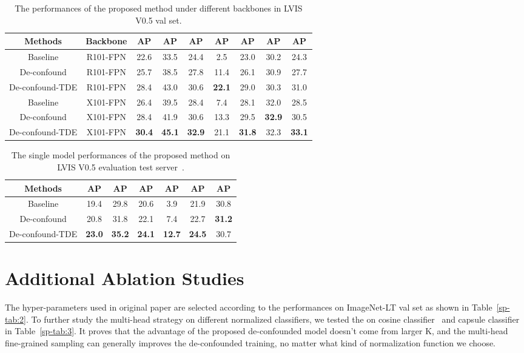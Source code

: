 \documentclass{article}
\begin{document}
\begin{table}
\centering
{
\begin{tabular}{c| c | c  c  c | c  c  c | c}
\hline
\hline
Methods & Backbone & AP & AP & AP & AP & AP & AP & AP \\
\hline
Baseline & R101-FPN & 22.6 & 33.5 & 24.4 & 2.5 & 23.0 & 30.2 & 24.3     \\
De-confound & R101-FPN & 25.7 & 38.5 & 27.8 & 11.4 & 26.1 & 30.9 & 27.7    \\
De-confound-TDE & R101-FPN & 28.4 & 43.0 & 30.6 & \textbf{22.1} & 29.0 & 30.3 & 31.0    \\
\hline
Baseline & X101-FPN & 26.4 & 39.5 & 28.4 & 7.4 & 28.1 & 32.0 & 28.5    \\
De-confound & X101-FPN & 28.4 & 41.9 & 30.6 & 13.3 & 29.5 & \textbf{32.9} & 30.5    \\
De-confound-TDE & X101-FPN & \textbf{30.4} & \textbf{45.1} & \textbf{32.9} & 21.1 & \textbf{31.8} & 32.3 & \textbf{33.1}    \\
\hline
\hline
\end{tabular}
}
\caption{The performances of the proposed method under different backbones in LVIS V0.5 val set.}
\label{sp-tab:5}
\end{table}


\begin{table}[ht!]
\centering
{
\begin{tabular}{c| c  c  c | c  c  c }
\hline
\hline
Methods & AP & AP & AP & AP & AP & AP \\
\hline
Baseline & 19.4 & 29.8 & 20.6 & 3.9 & 21.9 & 30.8    \\
De-confound & 20.8 & 31.8 & 22.1 & 7.4 & 22.7 & \textbf{31.2}    \\
De-confound-TDE & \textbf{23.0} & \textbf{35.2} & \textbf{24.1} & \textbf{12.7} & \textbf{24.5} & 30.7  \\
\hline
\hline
\end{tabular}
}
\caption{The single model performances of the proposed method on LVIS V0.5 evaluation test server~\cite{LVISeval}.}
\label{sp-tab:6}
\end{table}


\section{Additional Ablation Studies}
The hyper-parameters used in original paper are selected according to the performances on ImageNet-LT val set as shown in Table~\ref{sp-tab:2}. To further study the multi-head strategy on different normalized classifiers, we tested the  on cosine classifier~\cite{gidaris2018dynamic, qi2018low} and capsule classifier~\cite{liu2019large, sabour2017dynamic} in Table~\ref{sp-tab:3}. It proves that the advantage of the proposed de-confounded model doesn't come from larger K, and the multi-head fine-grained sampling can generally improves the de-confounded training, no matter what kind of normalization function we choose.
\end{document}
